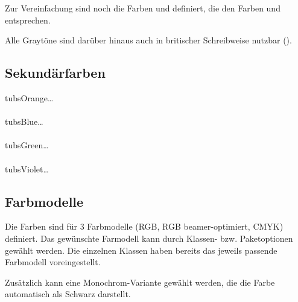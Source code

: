 
Zur Vereinfachung sind noch die Farben  und
 definiert, die den Farben  und
 entsprechen.

Alle Graytöne sind darüber hinaus auch in britischer Schreibweise nutzbar
().


\pagebreak
\subsection{Sekundärfarben}

  tubsOrange\ldots\\
  \\[-1ex]
  tubsBlue\ldots\\
  \\[-1ex]
  tubsGreen\ldots\\
  \\[-1ex]
  tubsViolet\ldots\\


% 

\subsection{Farbmodelle}

Die Farben sind für 3 Farbmodelle (\acrshort{RGB}, RGB beamer-optimiert, \acrshort{CMYK}) definiert.
Das gewünschte Farmodell kann durch Klassen- bzw. Paketoptionen gewählt werden.
Die einzelnen Klassen haben bereits das jeweils passende Farbmodell voreingestellt.

Zusätzlich kann eine Monochrom-Variante gewählt werden, die die Farbe
 automatisch als Schwarz darstellt.



